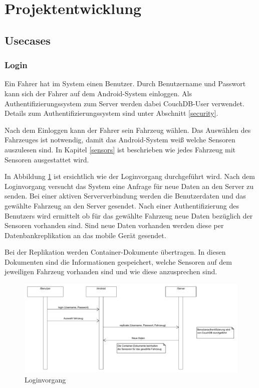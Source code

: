 \section{Projektentwicklung}
\label{sec:development}

\subsection{Usecases}

\subsubsection{Login}

Ein Fahrer hat im System einen Benutzer. Durch Benutzername und Passwort kann sich der Fahrer auf dem Android-System einloggen. Als Authentifizierungssystem zum Server werden dabei CouchDB-User verwendet. Details zum Authentifizierungssystem sind unter Abschnitt \ref{security}.

Nach dem Einloggen kann der Fahrer sein Fahrzeug wählen. Das Auswählen des Fahrzeuges ist notwendig, damit das Android-System weiß welche Sensoren auszulesen sind. In Kapitel \ref{sensors} ist beschrieben wie jedes Fahrzeug mit Sensoren ausgestattet wird. 

In Abbildung \ref{fig:login} ist ersichtlich wie der Loginvorgang durchgeführt wird. Nach dem Loginvorgang versucht das System eine Anfrage für neue Daten an den Server zu senden.  Bei einer aktiven Serververbindung werden die Benutzerdaten und das gewählte Fahrzeug an den Server gesendet. Nach einer Authentifizierung des Benutzers wird ermittelt ob für das gewählte Fahrzeug neue Daten bezüglich der Sensoren vorhanden sind. Sind neue Daten vorhanden werden diese per Datenbankreplikation an das mobile Gerät gesendet.

Bei der Replikation werden Container-Dokumente übertragen. In diesen Dokumenten sind die Informationen gespeichert, welche Sensoren auf dem jeweiligen Fahrzeug vorhanden sind und wie diese anzusprechen sind.

\begin{figure}
	\centering
		\includegraphics[width=\textwidth]{files/pdf/Login.pdf}
	\caption{Loginvorgang}
	\label{fig:login}
\end{figure}


